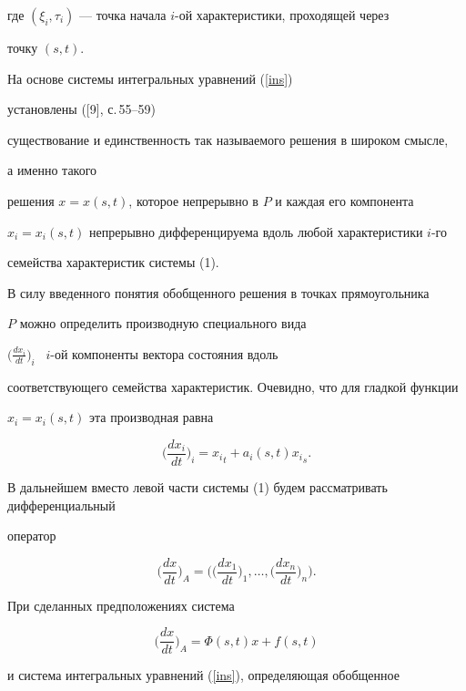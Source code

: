 где $(\xi_i,\tau_i)$ --- точка начала $i$-ой характеристики, проходящей через


точку $(s,t)$.





На основе системы интегральных уравнений (\ref{ins}) 


установлены ([9], с.\,55--59)


существование и единственность так называемого решения в широком смысле,


а именно такого


решения $x=x(s,t)$, которое непрерывно в $P$ и каждая его компонента


$x_i=x_i(s,t)$ непрерывно дифференцируема вдоль любой характеристики $i$-го


семейства характеристик системы (1).





В силу введенного понятия обобщенного решения в точках прямоугольника


$P$ можно определить производную специального вида


$\big(


\frac{dx_i}{dt}\big)_i$ \ $i$-ой компоненты вектора состояния вдоль


соответствующего семейства характеристик. Очевидно, что для гладкой функции


$x_i=x_i(s,t)$ эта производная равна


$$


\bigg(\frac{dx_i}{dt}\bigg)_i={x_i}_t+a_i(s,t){x_i}_s.


$$


В дальнейшем вместо левой части системы (1) будем рассматривать дифференциальный


оператор


$$


\bigg(\frac{dx}{dt}\bigg)_A=\bigg(\bigg(\frac{dx_1}{dt}\bigg)_1,


\dotsc,\bigg(\frac{dx_n}{dt}\bigg)_n\bigg).


$$





При сделанных предположениях система


$$


\bigg(\frac{dx}{dt}\bigg)_A=\Phi (s,t)x + f(s,t)


$$


и система интегральных уравнений (\ref{ins}), определяющая обобщенное


